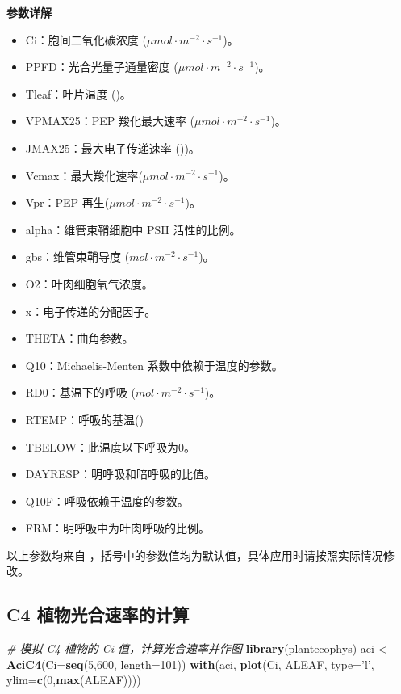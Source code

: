\documentclass[]{krantz}
\makeatletter
\newenvironment{Shaded}{\begin{snugshade}}{\end{snugshade}}
\newcommand{\KeywordTok}[1]{\textcolor[rgb]{0.13,0.29,0.53}{\textbf{#1}}}
\newcommand{\DataTypeTok}[1]{\textcolor[rgb]{0.13,0.29,0.53}{#1}}
\newcommand{\DecValTok}[1]{\textcolor[rgb]{0.00,0.00,0.81}{#1}}
\newcommand{\StringTok}[1]{\textcolor[rgb]{0.31,0.60,0.02}{#1}}
\newcommand{\CommentTok}[1]{\textcolor[rgb]{0.56,0.35,0.01}{\textit{#1}}}
\newcommand{\NormalTok}[1]{#1}
\providecommand{\tightlist}{%
  \setlength{\itemsep}{0pt}\setlength{\parskip}{0pt}}
\newenvironment{kframe}{%
\medskip{}
\setlength{\fboxsep}{.8em}
 \def\at@end@of@kframe{}%
 \ifinner\ifhmode%
  \def\at@end@of@kframe{\end{minipage}}%
  \begin{minipage}{\columnwidth}%
 \fi\fi%
 \def\FrameCommand##1{\hskip\@totalleftmargin \hskip-\fboxsep
 \colorbox{shadecolor}{##1}\hskip-\fboxsep
     \hskip-\linewidth \hskip-\@totalleftmargin \hskip\columnwidth}%
 \MakeFramed {\advance\hsize-\width
   \@totalleftmargin\z@ \linewidth\hsize
   \@setminipage}}%
 {\par\unskip\endMakeFramed%
 \at@end@of@kframe}
\renewenvironment{Shaded}{\begin{kframe}}{\end{kframe}}
\theoremstyle{definition}
\theoremstyle{definition}
\theoremstyle{definition}
\theoremstyle{remark}
\makeatother
\begin{document}
\textbf{参数详解}

\begin{itemize}
\tightlist
\item
  Ci：胞间二氧化碳浓度 (\(\mu mol\cdot m^{-2}\cdot s^{-1}\))。
\item
  PPFD：光合光量子通量密度 (\(\mu mol\cdot m^{-2}\cdot s^{-1}\))。
\item
  Tleaf：叶片温度 (\textcelsius)。
\item
  VPMAX25：PEP 羧化最大速率 (\(\mu mol\cdot m^{-2}\cdot s^{-1}\))。
\item
  JMAX25：最大电子传递速率 (\textcelsius))。
\item
  Vcmax：最大羧化速率(\(\mu mol\cdot m^{-2}\cdot s^{-1}\))。
\item
  Vpr：PEP 再生(\(\mu mol\cdot m^{-2}\cdot s^{-1}\))。
\item
  alpha：维管束鞘细胞中 PSII 活性的比例。
\item
  gbs：维管束鞘导度 (\(mol\cdot m^{-2}\cdot s^{-1}\))。
\item
  O2：叶肉细胞氧气浓度。
\item
  x：电子传递的分配因子。
\item
  THETA：曲角参数。
\item
  Q10：Michaelis-Menten 系数中依赖于温度的参数。
\item
  RD0：基温下的呼吸 (\(mol\cdot m^{-2}\cdot s^{-1}\))。
\item
  RTEMP：呼吸的基温(\textcelsius)
\item
  TBELOW：此温度以下呼吸为0。
\item
  DAYRESP：明呼吸和暗呼吸的比值。
\item
  Q10F：呼吸依赖于温度的参数。
\item
  FRM：明呼吸中为叶肉呼吸的比例。
\end{itemize}

以上参数均来自
\citet{Caemmerer2000Biochemical}，括号中的参数值均为默认值，具体应用时请按照实际情况修改。

\subsection{C4 植物光合速率的计算}\label{c4-}

\begin{Shaded}
\begin{Highlighting}[]
\CommentTok{# 模拟 C4 植物的 Ci 值，计算光合速率并作图}
\KeywordTok{library}\NormalTok{(plantecophys)}
\NormalTok{aci <-}\StringTok{ }\KeywordTok{AciC4}\NormalTok{(}\DataTypeTok{Ci=}\KeywordTok{seq}\NormalTok{(}\DecValTok{5}\NormalTok{,}\DecValTok{600}\NormalTok{, }\DataTypeTok{length=}\DecValTok{101}\NormalTok{))}
\KeywordTok{with}\NormalTok{(aci, }\KeywordTok{plot}\NormalTok{(Ci, ALEAF, }\DataTypeTok{type=}\StringTok{'l'}\NormalTok{, }\DataTypeTok{ylim=}\KeywordTok{c}\NormalTok{(}\DecValTok{0}\NormalTok{,}\KeywordTok{max}\NormalTok{(ALEAF))))}
\end{Highlighting}
\end{Shaded}
\end{document}
